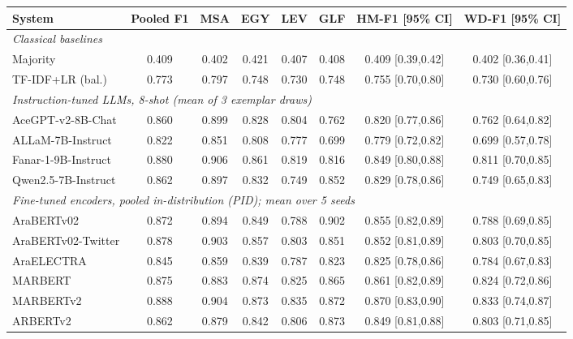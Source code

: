 \begin{tabular}{lccccccc}
\toprule
\textbf{System} & \textbf{Pooled F1} & \textbf{MSA} & \textbf{EGY} & \textbf{LEV} & \textbf{GLF} & \textbf{HM-F1 [95\% CI]} & \textbf{WD-F1 [95\% CI]} \\
\midrule
\multicolumn{8}{l}{\emph{Classical baselines}} \\
Majority & 0.409 & 0.402 & 0.421 & 0.407 & 0.408 & 0.409 {\scriptsize[0.39,0.42]} & 0.402 {\scriptsize[0.36,0.41]} \\
TF-IDF+LR (bal.) & 0.773 & 0.797 & 0.748 & 0.730 & 0.748 & 0.755 {\scriptsize[0.70,0.80]} & 0.730 {\scriptsize[0.60,0.76]} \\
\midrule
\multicolumn{8}{l}{\emph{Instruction-tuned LLMs, 8-shot (mean of 3 exemplar draws)}} \\
AceGPT-v2-8B-Chat & 0.860 & 0.899 & 0.828 & 0.804 & 0.762 & 0.820 {\scriptsize[0.77,0.86]} & 0.762 {\scriptsize[0.64,0.82]} \\
ALLaM-7B-Instruct & 0.822 & 0.851 & 0.808 & 0.777 & 0.699 & 0.779 {\scriptsize[0.72,0.82]} & 0.699 {\scriptsize[0.57,0.78]} \\
Fanar-1-9B-Instruct & 0.880 & 0.906 & 0.861 & 0.819 & 0.816 & 0.849 {\scriptsize[0.80,0.88]} & 0.811 {\scriptsize[0.70,0.85]} \\
Qwen2.5-7B-Instruct & 0.862 & 0.897 & 0.832 & 0.749 & 0.852 & 0.829 {\scriptsize[0.78,0.86]} & 0.749 {\scriptsize[0.65,0.83]} \\
\midrule
\multicolumn{8}{l}{\emph{Fine-tuned encoders, pooled in-distribution (PID); mean over 5 seeds}} \\
AraBERTv02 & 0.872 & 0.894 & 0.849 & 0.788 & 0.902 & 0.855 {\scriptsize[0.82,0.89]} & 0.788 {\scriptsize[0.69,0.85]} \\
AraBERTv02-Twitter & 0.878 & 0.903 & 0.857 & 0.803 & 0.851 & 0.852 {\scriptsize[0.81,0.89]} & 0.803 {\scriptsize[0.70,0.85]} \\
AraELECTRA & 0.845 & 0.859 & 0.839 & 0.787 & 0.823 & 0.825 {\scriptsize[0.78,0.86]} & 0.784 {\scriptsize[0.67,0.83]} \\
MARBERT & 0.875 & 0.883 & 0.874 & 0.825 & 0.865 & 0.861 {\scriptsize[0.82,0.89]} & 0.824 {\scriptsize[0.72,0.86]} \\
MARBERTv2 & 0.888 & 0.904 & 0.873 & 0.835 & 0.872 & 0.870 {\scriptsize[0.83,0.90]} & 0.833 {\scriptsize[0.74,0.87]} \\
ARBERTv2 & 0.862 & 0.879 & 0.842 & 0.806 & 0.873 & 0.849 {\scriptsize[0.81,0.88]} & 0.803 {\scriptsize[0.71,0.85]} \\

\end{tabular}
